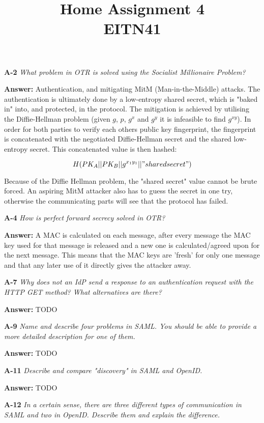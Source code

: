 \documentclass[a4paper]{article}
\title{Home Assignment 4 \\ EITN41}
\author{}
\date{}
\newcommand{\Q}[2]{ \vspace{10pt} \textbf{A-#1} \textit{#2} }
\newcommand{\A}[1]{ \textbf{Answer:} #1 }
\begin{document}
\maketitle

\Q{2} { %
    What problem in OTR is solved using the Socialist Millionaire Problem?
}

\A{
    Authentication, and mitigating MitM (Man-in-the-Middle) attacks. 
    The authentication is ultimately done by a low-entropy shared
    secret, which is "baked in" into, and protected, in the protocol.
    The mitigation is achieved by utilising the Diffie-Hellman
    problem (given $g$, $p$, $g^x$ and $g^y$ it is infeasible 
    to find $g^{xy}$). In order for both parties to verify 
    each others public key fingerprint, the fingerprint is
    concatenated with the negotiated Diffie-Hellman secret 
    and the shared low-entropy secret. This concatenated value 
    is then hashed:

    $$H(PK_A || PK_B || g^{x_1y_1} || "shared secret")$$

    Because of the Diffie Hellman problem, the "shared secret" value 
    cannot be brute forced. An aspiring MitM attacker also has
    to guess the secret in one try, otherwise the communicating
    parts will see that the protocol has failed.
}

\Q{4} {
    How is perfect forward secrecy solved in OTR?
}

\A{
    A MAC is calculated on each message, after every message the MAC key used 
    for that message is released and a new one is calculated/agreed upon
    for the next message. This means that the MAC keys are 'fresh' for only
    one message and that any later use of it directly gives
    the attacker away.
}

\Q{7} {
    Why does not an IdP send a response to an authentication request with the 
    HTTP GET method? What alternatives are there?
}

\A{
    TODO
}

\Q{9} {
    Name and describe four problems in SAML. You should be able to provide a 
    more detailed description for one of them.
}

\A{
    TODO
}

\Q{11} {
    Describe and compare "discovery" in SAML and OpenID.
}

\A{
    TODO
}

\Q{12} {
    In a certain sense, there are three different types of communication in 
    SAML and two in OpenID. Describe them and explain the difference.
}
\end{document}
